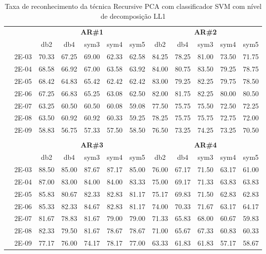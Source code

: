 \begin{table}[H]
	\centering
    \normalsize
	\caption{Taxa de reconhecimento da técnica Recursive PCA com classificador SVM com nível de decomposição LL1}
	\begin{tabular}{|c|c|c c c c c|c c c c c|}
\cline{3-12}
\multicolumn{2}{c|}{\multirow{2}{*}{}} & \multicolumn{5}{c|}{\textbf{AR\#1}}  & \multicolumn{5}{c|}{\textbf{AR\#2}} \\\cline{3-12}

\multicolumn{2}{c|}{}  & db2 & db4 & sym3 & sym4 & sym5 & db2 & db4& sym3 & sym4 & sym5 \\\hline
\multicolumn{1}{|c|}{ \multirow{6}{*}{\rotatebox[origin=c]{90}{\textbf{Gamma}}} }
&2E-03&	70.33&	67.25&	69.00&	62.33&	62.58&	84.25&	78.25&	81.00&	73.50&	71.75	\\\cline{2-12}
&2E-04&	68.58&	66.92&	67.00&	63.58&	63.92&	84.00&	80.75&	83.50&	79.25&	78.75	\\\cline{2-12}
&2E-05&	68.42&	64.83&	65.42&	62.42&	62.42&	83.00&	79.25&	82.25&	79.75&	78.50	\\\cline{2-12}
&2E-06&	67.25&	66.83&	65.25&	63.08&	62.50&	82.00&	81.75&	82.25&	80.00&	80.50	\\\cline{2-12}
&2E-07&	63.25&	60.50&	60.50&	60.08&	59.08&	77.50&	75.75&	75.50&	72.50&	72.25	\\\cline{2-12}
&2E-08&	63.50&	60.92&	60.92&	60.33&	59.25&	78.25&	75.75&	75.75&	72.75&	72.00	\\\cline{2-12}
&2E-09&	58.83&	56.75&	57.33&	57.50&	58.50&	76.50&	73.25&	74.25&	73.25&	70.50	
	



\\ \midrule
\multicolumn{12}{c}{}\\ 

\cline{3-12}
\multicolumn{2}{c}{} & \multicolumn{5}{|c|}{\textbf{AR\#3}}  & \multicolumn{5}{c|}{\textbf{AR\#4}} \\\cline{3-12}
\multicolumn{2}{c}{}  & \multicolumn{1}{|c}{db2} & db4 & sym3 & sym4 & sym5 & db2 & db4& sym3 & sym4 & sym5 \\\hline
\multicolumn{1}{|c|}{ \multirow{6}{*}{\rotatebox[origin=c]{90}{\textbf{Gamma}}} }
&2E-03&	88.50&	85.00&	87.67&	87.17&	85.00&	76.00&	67.17&	71.50&	63.17&	61.00	\\\cline{2-12}
&2E-04&	87.00&	83.00&	84.00&	84.00&	83.33&	75.00&	69.17&	71.33&	63.83&	63.83	\\\cline{2-12}
&2E-05&	85.83&	80.67&	82.33&	82.83&	81.17&	75.17&	69.83&	71.50&	62.83&	62.83	\\\cline{2-12}
&2E-06&	85.33&	82.33&	84.67&	82.83&	81.17&	74.00&	70.33&	71.67&	63.17&	64.17	\\\cline{2-12}
&2E-07&	81.67&	78.83&	81.67&	79.00&	79.00&	71.33&	65.83&	68.00&	60.67&	59.83	\\\cline{2-12}
&2E-08&	82.33&	79.50&	81.67&	78.67&	78.67&	71.00&	65.67&	67.33&	60.83&	60.33	\\\cline{2-12}
&2E-09&	77.17&	76.00&	74.17&	78.17&	77.00&	63.33&	61.83&	61.83&	57.17&	58.67	
	


\end{tabular}
\end{table}
